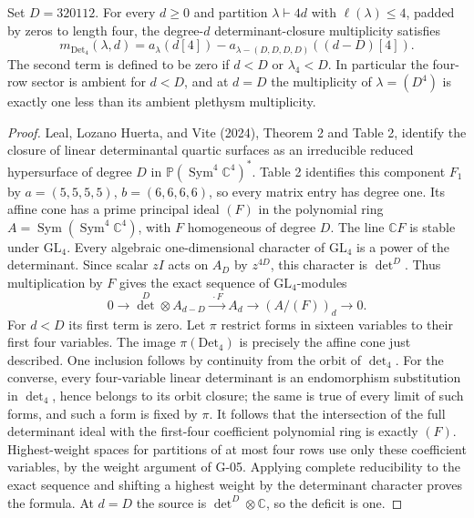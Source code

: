 \begin{proposition}\label{G-07}
Set $D=320112$. For every $d\geq0$ and partition $\lambda\vdash4d$ with $\ell(\lambda)\leq4$, padded by zeros to length four, the degree-$d$ determinant-closure multiplicity satisfies
\[
 m_{\mathrm{Det}_4}(\lambda,d)
 =a_\lambda(d[4])-a_{\lambda-(D,D,D,D)}((d-D)[4]).
\]
The second term is defined to be zero if $d<D$ or $\lambda_4<D$. In particular the four-row sector is ambient for $d<D$, and at $d=D$ the multiplicity of $\lambda=(D^4)$ is exactly one less than its ambient plethysm multiplicity.
\end{proposition}
\begin{proof}
Leal, Lozano Huerta, and Vite (2024), Theorem 2 and Table 2, identify the closure of linear determinantal quartic surfaces as an irreducible reduced hypersurface of degree $D$ in $\mathbb P(\operatorname{Sym}^4\mathbb C^4)^*$. Table 2 identifies this component $F_1$ by $a=(5,5,5,5)$, $b=(6,6,6,6)$, so every matrix entry has degree one. Its affine cone has a prime principal ideal $(F)$ in the polynomial ring $A=\operatorname{Sym}(\operatorname{Sym}^4\mathbb C^4)$, with $F$ homogeneous of degree $D$.
The line $\mathbb CF$ is stable under $\mathrm{GL}_4$. Every algebraic one-dimensional character of $\mathrm{GL}_4$ is a power of the determinant. Since scalar $zI$ acts on $A_D$ by $z^{4D}$, this character is $\det^D$. Thus multiplication by $F$ gives the exact sequence of $\mathrm{GL}_4$-modules
\[
 0\longrightarrow \det^D\otimes A_{d-D}\xrightarrow{\ \cdot F\ }A_d
 \longrightarrow(A/(F))_d\longrightarrow0.
\]
For $d<D$ its first term is zero.
Let $\pi$ restrict forms in sixteen variables to their first four variables. The image $\pi(\mathrm{Det}_4)$ is precisely the affine cone just described. One inclusion follows by continuity from the orbit of $\det_4$. For the converse, every four-variable linear determinant is an endomorphism substitution in $\det_4$, hence belongs to its orbit closure; the same is true of every limit of such forms, and such a form is fixed by $\pi$. It follows that the intersection of the full determinant ideal with the first-four coefficient polynomial ring is exactly $(F)$. Highest-weight spaces for partitions of at most four rows use only these coefficient variables, by the weight argument of G-05. Applying complete reducibility to the exact sequence and shifting a highest weight by the determinant character proves the formula. At $d=D$ the source is $\det^D\otimes\mathbb C$, so the deficit is one.
\end{proof}
